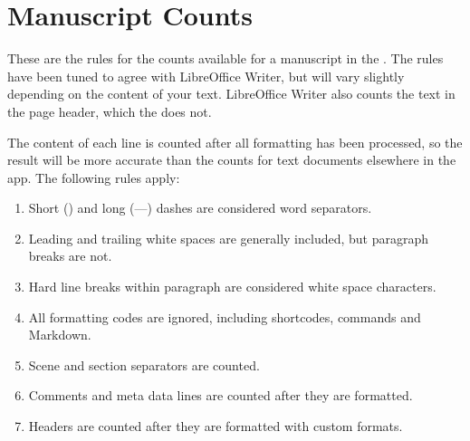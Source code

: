 \documentclass[a4paper,11pt,english]{sphinxmanual}
\begin{document}
\section{Manuscript Counts}
\label{\detokenize{more_counting:manuscript-counts}}
\sphinxAtStartPar
These are the rules for the counts available for a manuscript in the . The rules
have been tuned to agree with LibreOffice Writer, but will vary slightly depending on the content
of your text. LibreOffice Writer also counts the text in the page header, which the  does not.

\sphinxAtStartPar
The content of each line is counted after all formatting has been processed, so the result will be
more accurate than the counts for text documents elsewhere in the app. The following rules apply:
\begin{enumerate}
%
\item {} 
\sphinxAtStartPar
Short (\textendash{}) and long (—) dashes are considered word separators.

\item {} 
\sphinxAtStartPar
Leading and trailing white spaces are generally included, but paragraph breaks are not.

\item {} 
\sphinxAtStartPar
Hard line breaks within paragraph are considered white space characters.

\item {} 
\sphinxAtStartPar
All formatting codes are ignored, including shortcodes, commands and Markdown.

\item {} 
\sphinxAtStartPar
Scene and section separators are counted.

\item {} 
\sphinxAtStartPar
Comments and meta data lines are counted after they are formatted.

\item {} 
\sphinxAtStartPar
Headers are counted after they are formatted with custom formats.

\end{enumerate}
\end{document}
